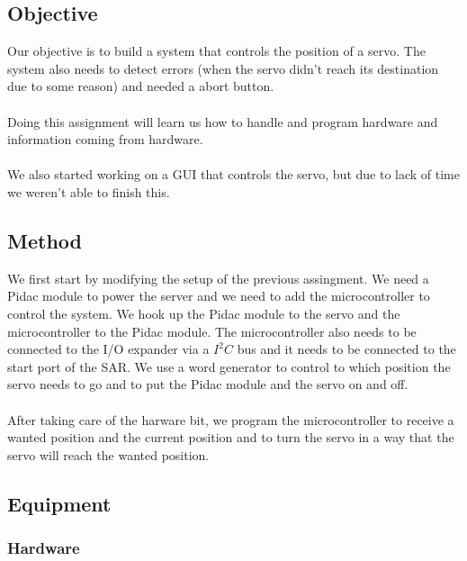 \documentclass[a4paper, 12pt, titlepage]{article}
\begin{document}
\subsection{Objective} %
Our objective is to build a system that controls the position of a servo. The system also needs to detect errors (when the servo didn't reach its destination due to some reason) and needed a abort button. \\
\\
Doing this assignment will learn us how to handle and program hardware and information coming from hardware. \\
\\
We also started working on a GUI that controls the servo, but due to lack of time we weren't able to finish this.

\subsection{Method} %
We first start by modifying the setup of the previous assingment. We need a Pidac module to power the server and we need to add the microcontroller to control the system. We hook up the Pidac module to the servo and the microcontroller to the Pidac module. The microcontroller also needs to be connected to the I/O expander via a $I^{2}C$ bus and it needs to be connected to the start port of the SAR. We use a word generator to control to which position the servo needs to go and to put the Pidac module and the servo on and off. \\
\\
After taking care of the harware bit, we program the microcontroller to receive a wanted position and the current position and to turn the servo in a way that the servo will reach the wanted position.

\subsection{Equipment} %

\subsubsection{Hardware}
\end{document}
